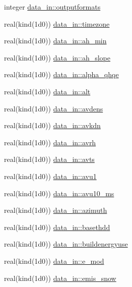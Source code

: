 \begin{DoxyCompactItemize}
\item 
integer \hyperlink{namespacedata__in_afeae0c4bf24c4eea3af4a7fded472b26}{data\+\_\+in\+::outputformats}
\item 
real(kind(1d0)) \hyperlink{namespacedata__in_ae7c74e8cbd3c208e00306eafe50a98c0}{data\+\_\+in\+::timezone}
\item 
real(kind(1d0)) \hyperlink{namespacedata__in_a711f2f13bee1efd47bef091504e3621d}{data\+\_\+in\+::ah\+\_\+min}
\item 
real(kind(1d0)) \hyperlink{namespacedata__in_ac10bf0a69520b391a81ee64742a4f6fd}{data\+\_\+in\+::ah\+\_\+slope}
\item 
real(kind(1d0)) \hyperlink{namespacedata__in_a6ecf207ff2ecfcb35e223ad4e761ff9b}{data\+\_\+in\+::alpha\+\_\+qhqe}
\item 
real(kind(1d0)) \hyperlink{namespacedata__in_a1f542f63d48efee0cd1e356f9f3ea1cf}{data\+\_\+in\+::alt}
\item 
real(kind(1d0)) \hyperlink{namespacedata__in_abf271c3057b02dd9183e4442954c9577}{data\+\_\+in\+::avdens}
\item 
real(kind(1d0)) \hyperlink{namespacedata__in_a8ac4d9de71d52d8c39e04c59635a5e3c}{data\+\_\+in\+::avkdn}
\item 
real(kind(1d0)) \hyperlink{namespacedata__in_a2c6cba95e27ebb1dcb673c457b66325d}{data\+\_\+in\+::avrh}
\item 
real(kind(1d0)) \hyperlink{namespacedata__in_ab6a63bf1eb3d5838645b22b8f26bc97c}{data\+\_\+in\+::avts}
\item 
real(kind(1d0)) \hyperlink{namespacedata__in_abc95201410a9b25f8d1d2d5a063302c3}{data\+\_\+in\+::avu1}
\item 
real(kind(1d0)) \hyperlink{namespacedata__in_ad753c5f26f6cfaac607edf93d4c2dd1d}{data\+\_\+in\+::avu10\+\_\+ms}
\item 
real(kind(1d0)) \hyperlink{namespacedata__in_a0abb9aefbb8c1dc5ac6ff2f770da7faa}{data\+\_\+in\+::azimuth}
\item 
real(kind(1d0)) \hyperlink{namespacedata__in_a1e8b73a7f5e115a447c6d8317490a479}{data\+\_\+in\+::basethdd}
\item 
real(kind(1d0)) \hyperlink{namespacedata__in_a181898a3db2411958a2a0f484e50a9f1}{data\+\_\+in\+::buildenergyuse}
\item 
real(kind(1d0)) \hyperlink{namespacedata__in_a737780f5cf53c9f2d3048bbfface32cd}{data\+\_\+in\+::e\+\_\+mod}
\item 
real(kind(1d0)) \hyperlink{namespacedata__in_a262cd82bafaff209c3bca1c3b368931b}{data\+\_\+in\+::emis\+\_\+snow}

\end{DoxyCompactItemize}

